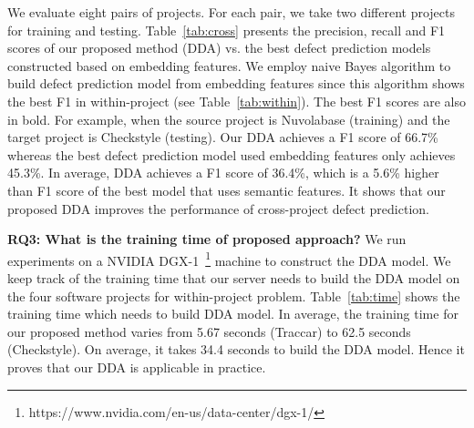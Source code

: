 We evaluate eight pairs of projects. For each pair, we take two different projects for training and testing. Table~\ref{tab:cross} presents the precision, recall and F1 scores of our proposed method (DDA) vs. the best defect prediction models constructed based on embedding features. We employ naive Bayes algorithm to build defect prediction model from embedding features since this algorithm shows the best F1 in within-project (see Table~\ref{tab:within}). The best F1 scores are also in bold. For example, when the source project is Nuvolabase (training) and the target project is Checkstyle (testing). Our DDA achieves a F1 score of 66.7\% whereas the best defect prediction model used embedding features only achieves 45.3\%. In average, DDA achieves a F1 score of 36.4\%, which is a 5.6\% higher than F1 score of the best model that uses semantic features. It shows that our proposed DDA improves the performance of cross-project defect prediction. 

\textbf{RQ3: What is the training time of proposed approach?}
We run experiments on a NVIDIA DGX-1~\footnote{https://www.nvidia.com/en-us/data-center/dgx-1/} machine to construct the DDA model. We keep track of the training time that our server needs to build the DDA model on the four software projects for within-project problem. Table~\ref{tab:time} shows the training time which needs to build DDA model. In average, the training time for our proposed method varies from 5.67 seconds (Traccar) to 62.5 seconds (Checkstyle). On average, it takes 34.4 seconds to build the DDA model. Hence it proves that our DDA is applicable in practice.


